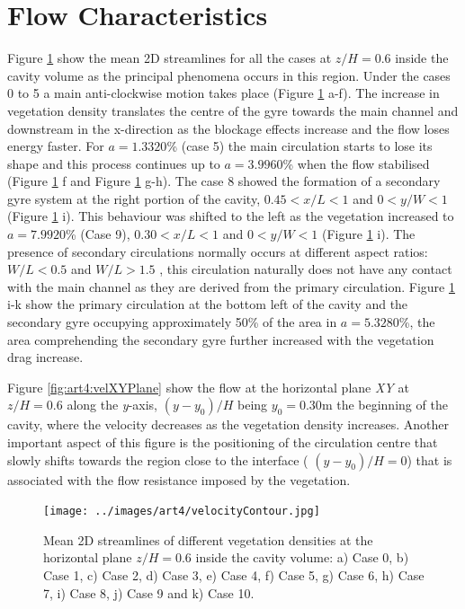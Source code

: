 \section{Flow Characteristics}
Figure \ref{fig:art4:velocityContour} show the mean 2D streamlines for all the cases at $z/H=0.6$ inside the cavity volume as the principal phenomena occurs in this region. Under the cases 0 to 5 a main anti-clockwise motion takes place (Figure \ref{fig:art4:velocityContour}  a-f). The increase in vegetation density translates the centre of the gyre towards the main channel and downstream in the x-direction as the blockage effects increase and the flow loses energy faster. For $a=1.3320$\% (case 5) the main circulation starts to lose its shape and this process continues up to $a=3.9960$\% when the flow stabilised (Figure \ref{fig:art4:velocityContour}  f and Figure \ref{fig:art4:velocityContour}  g-h). The case 8 showed the formation of a secondary gyre system at the right portion of the cavity, $0.45<x/L<1$ and $0<y/W<1$ (Figure \ref{fig:art4:velocityContour}  i). This behaviour was shifted to the left as the vegetation increased to $a=7.9920$\% (Case 9), $0.30<x/L<1$ and $0<y/W<1$ (Figure \ref{fig:art4:velocityContour}  i). The presence of secondary circulations normally occurs at different aspect ratios: $W/L<0.5$ and $W/L>1.5$ \cite{Sukhodolov2002}, this circulation naturally does not have any contact with the main channel as they are derived from the primary circulation. Figure \ref{fig:art4:velocityContour}  i-k show the primary circulation at the bottom left of the cavity and the secondary gyre occupying approximately 50\% of the area in $a=5.3280$\%, the area comprehending the secondary gyre further increased with the vegetation drag increase.

Figure \ref{fig:art4:velXYPlane} show the flow at the horizontal plane \textit{XY} at $z/H = 0.6$ along the \textit{y}-axis, $(y-y_0)/H$ being $y_0=0.30$m the beginning of the cavity, where the velocity decreases as the vegetation density increases. Another important aspect of this figure is the positioning of the circulation centre that slowly shifts towards the region close to the interface ( $(y-y_0)/H=0$) that is associated with the flow resistance imposed by the vegetation.

\begin{figure}[!htb]
\centering
\texttt{[image: ../images/art4/velocityContour.jpg]}
\caption{Mean 2D streamlines of different vegetation densities at the horizontal plane $z/H = 0.6$ inside the cavity volume: a) Case 0, b) Case 1, c) Case 2, d) Case 3, e) Case 4, f) Case 5, g) Case 6, h) Case 7, i) Case 8, j) Case 9 and k) Case 10.}
\label{fig:art4:velocityContour}
\end{figure}

